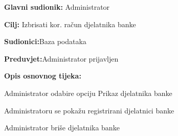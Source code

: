 \eject 
\noindent {}
\begin{packed_item}
	
	\item \textbf{Glavni sudionik: }{Administrator}
	\item  \textbf{Cilj:} {Izbrisati kor. račun djelatnika banke}
	\item  \textbf{Sudionici:}{Baza podataka}
	\item  \textbf{Preduvjet:}{Administrator prijavljen}
	\item  \textbf{Opis osnovnog tijeka:}
	
	\item[] \begin{packed_enum}
		
		\item {Administrator odabire opciju Prikaz djelatnika banke}
		\item {Administratoru se pokažu registrirani djelatnici banke}
		\item {Administrator briše djelatnika banke}
		
	\end{packed_enum}
	
\end{packed_item}

